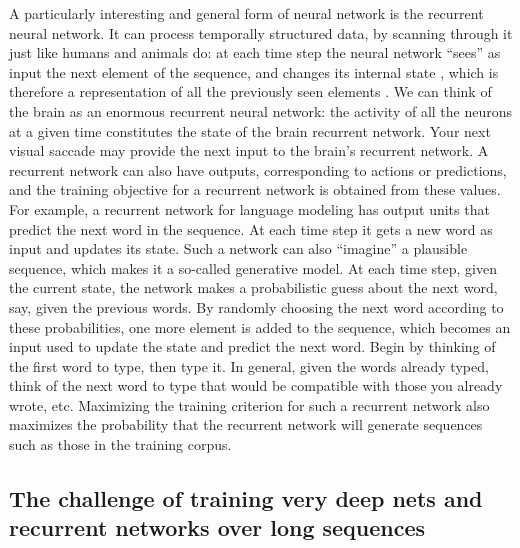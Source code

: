 \documentclass[11pt]{article} %
\begin{document}
A particularly interesting and general form of neural network is the
recurrent neural network. It can process temporally structured data, by
scanning through it just like humans and animals do: at each time step the
neural network “sees” as input the next element of the sequence, and
changes its internal state , which is therefore a representation of all the
previously seen elements . We can think of the brain as an enormous
recurrent neural network: the activity of all the neurons at a given time
constitutes the state of the brain recurrent network. Your next visual
saccade may provide the next input to the brain’s recurrent network. A
recurrent network can also have outputs, corresponding to actions or
predictions, and the training objective for a recurrent network is
obtained from these values. For example, a recurrent network for language
modeling has output units that predict the next word in the sequence. At
each time step it gets a new word as input and updates its state. Such a
network can also “imagine” a plausible sequence, which makes it a so-called
generative model.  At each time step, given the current state, the network
makes a probabilistic guess about the next word, say, given the previous
words. By randomly choosing the next word according to these probabilities,
one more element is added to the sequence, which becomes an input used to
update the state and predict the next word. Begin by thinking of the first
word to type, then type it. In general, given the words already typed,
think of the next word to type that would be compatible with those you
already wrote, etc. Maximizing the training criterion for such a recurrent
network also maximizes the probability that the recurrent network will
generate sequences such as those in the training corpus.


\subsection{The challenge of training very deep nets and recurrent networks over long sequences}
\end{document}
